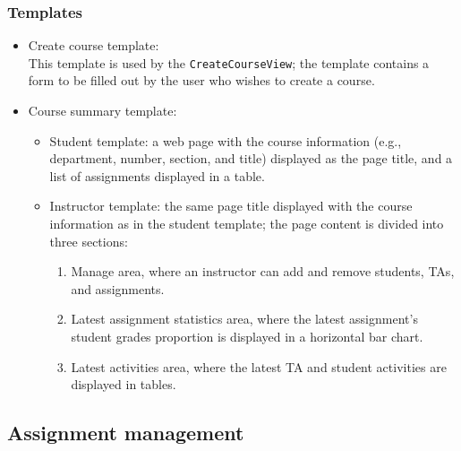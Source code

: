 \subsubsection{Templates}
\begin{itemize}
    \item Create course template: \\
        This template is used by the \texttt{CreateCourseView}; the template
        contains a form to be filled out by the user who
        wishes to create a course. 
    \item Course summary template:
    \begin{itemize}
        \item Student template: a web page with the course information
            (e.g., department, number, section, and title)
            displayed as the page title, and a list of assignments displayed
            in a table.
        \item Instructor template: the same page title displayed with the course
            information as in the student template;
            the page content is divided into three sections:
            \begin{enumerate}
                \item Manage area, where an instructor can add and remove
                    students, TAs, and assignments.
                \item Latest assignment statistics area, where the latest
                    assignment's student grades proportion is displayed
                    in a horizontal bar chart.
                \item Latest activities area, where the latest TA and student
                    activities are displayed in tables.
            \end{enumerate}
    \end{itemize}
\end{itemize}

\FloatBarrier





\subsection{Assignment management}
\label{sec:ASM_MAN}


